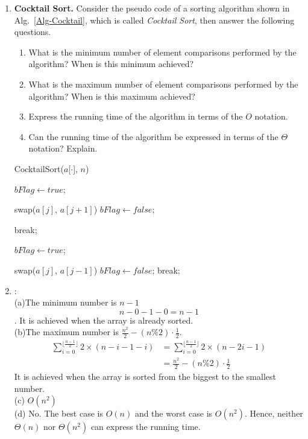 \documentclass[12pt,a4paper]{article}
\makeatletter
\newtheorem*{solution}{Solution}
\theoremstyle{definition}
\renewenvironment{solution}[1][Solution] {\par\pushQED{\qed}\normalfont\topsep6\p@\@plus6\p@\relax\trivlist\item[\hskip\labelsep\bfseries#1\@addpunct{.}]\ignorespaces}{\popQED\endtrivlist\@endpefalse} \makeatother
\makeatother
\begin{document}
\begin{enumerate}

\item \textbf{Cocktail Sort.} Consider the pseudo code of a sorting algorithm shown in Alg.~\ref{Alg-Cocktail}, which is called \emph{Cocktail Sort}, then answer the following questions.


\begin{minipage}[t]{0.4\textwidth}
\begin{enumerate}
\item What is the minimum number of element comparisons performed by the algorithm? When is this minimum achieved?
\item What is the maximum number of element comparisons performed by the algorithm? When is this maximum achieved?
\item Express the running time of the algorithm in terms of the $O$ notation.
\item Can the running time of the algorithm be expressed in terms of the $\Theta$ notation? Explain.
\end{enumerate}
\end{minipage}
\hspace{2mm}
\begin{minipage}[t]{0.5\textwidth}
\begin{algorithm}[H]
		\caption{CocktailSort($a$[$\cdot$], $n$)} \label{Alg-Cocktail}
		{
			$bFlag \leftarrow true$;
			
			{
				{
					swap($a[j]$, $a[j+1]$)\;
					$bFlag \leftarrow false$;
				}
			}
			
			{
				break;
			}
			
			$bFlag \leftarrow true$;			
			
			{
				{
					swap($a[j]$, $a[j-1]$)\;
					$bFlag \leftarrow false$;
				}
			}
			{
				break;
			}
		}
\end{algorithm}
\end{minipage}

\begin{solution}
	: \\
	(a)The minimum number is $n-1$
	$$
	n-0-1-0 = n-1
	$$. 
	It is achieved when the array is already sorted. \\
	(b)The maximum number is $\frac{n^2}{2}-(n \% 2)\cdot \frac{1}{2}$. 
	\begin{align*}
		\sum_{i=0}^{\lfloor \frac{n-1}{2} \rfloor} 2 \times (n-i-1-i) &= \sum_{i=0}^{\lfloor \frac{n-1}{2} \rfloor} 2 \times (n-2i-1) \\ 
		& = \frac{n^2}{2}-(n \% 2)\cdot \frac{1}{2}
	\end{align*}
	It is achieved when the array is sorted from the biggest to the smallest number. \\
	(c) $O(n^2)$ \\
	(d) No. The best case is $O(n)$ and the worst case is $O(n^2)$. Hence, neither $\Theta(n)$ nor $\Theta(n^2)$ can express the running time.
\end{solution}


\end{enumerate}
\end{document}
